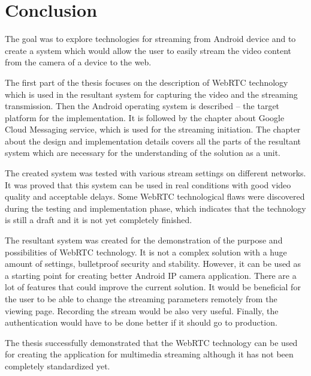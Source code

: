 % 
\chapter{Conclusion}
\label{chap:chapter7}

The goal was to explore technologies for streaming from Android device and to create a system which would allow the user to easily stream the video content from the camera of a device to the web.

The first part of the thesis focuses on the description of WebRTC technology which is used in the resultant system for capturing the video and the streaming transmission. Then the Android operating system is described -- the target platform for the implementation. It is followed by the chapter about Google Cloud Messaging service, which is used for the streaming initiation. The chapter about the design and implementation details covers all the parts of the resultant system which are necessary for the understanding of the solution as a unit.

The created system was tested with various stream settings on different networks. It was proved that this system can be used in real conditions with good video quality and acceptable delays. Some WebRTC technological flaws were discovered during the testing and implementation phase, which indicates that the technology is still a draft and it is not yet completely finished. 

The resultant system was created for the demonstration of the purpose and possibilities of WebRTC technology. It is not a complex solution with a huge amount of settings, bulletproof security and stability. However, it can be used as a starting point for creating better Android IP camera application. There are a lot of features that could improve the current solution. It would be beneficial for the user to be able to change the streaming parameters remotely from the viewing page. Recording the stream would be also very useful. Finally, the authentication would have to be done better if it should go to production.

The thesis successfully demonstrated that the WebRTC technology can be used for creating the application for multimedia streaming although it has not been completely standardized yet.